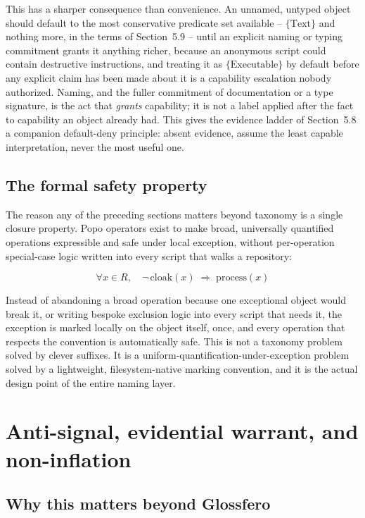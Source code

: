\documentclass[11pt]{article}
\begin{document}
This has a sharper consequence than convenience. An unnamed, untyped object should default to the most conservative predicate set available -- $\{\mathrm{Text}\}$ and nothing more, in the terms of Section~5.9 -- until an explicit naming or typing commitment grants it anything richer, because an anonymous script could contain destructive instructions, and treating it as $\{\mathrm{Executable}\}$ by default before any explicit claim has been made about it is a capability escalation nobody authorized. Naming, and the fuller commitment of documentation or a type signature, is the act that \emph{grants} capability; it is not a label applied after the fact to capability an object already had. This gives the evidence ladder of Section~5.8 a companion default-deny principle: absent evidence, assume the least capable interpretation, never the most useful one.

\subsection{The formal safety property}

The reason any of the preceding sections matters beyond taxonomy is a single closure property. Popo operators exist to make broad, universally quantified operations expressible and safe under local exception, without per-operation special-case logic written into every script that walks a repository:

\begin{equation}
\forall x \in R,\quad \neg\,\mathrm{cloak}(x) \;\Rightarrow\; \mathrm{process}(x)
\end{equation}

Instead of abandoning a broad operation because one exceptional object would break it, or writing bespoke exclusion logic into every script that needs it, the exception is marked locally on the object itself, once, and every operation that respects the convention is automatically safe. This is not a taxonomy problem solved by clever suffixes. It is a uniform-quantification-under-exception problem solved by a lightweight, filesystem-native marking convention, and it is the actual design point of the entire naming layer.


\section{Anti-signal, evidential warrant, and non-inflation}

\subsection{Why this matters beyond Glossfero}
\end{document}
